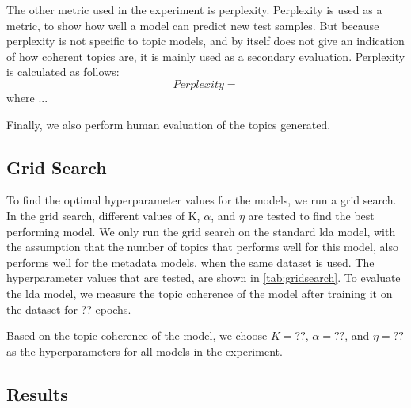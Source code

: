 The other metric used in the experiment is perplexity.
Perplexity is used as a metric, to show how well a model can predict new test samples.
But because perplexity is not specific to topic models, and by itself does not give an indication of how coherent topics are, it is mainly used as a secondary evaluation.
Perplexity is calculated as follows:
\begin{equation}
	Perplexity = 
\end{equation}
\noindent where ...

Finally, we also perform human evaluation of the topics generated.

\subsection{Grid Search}\label{sec:experiment_gridsearch}
To find the optimal hyperparameter values for the models, we run a grid search.
In the grid search, different values of K, $\alpha$, and $\eta$ are tested to find the best performing model.
We only run the grid search on the standard \gls{lda} model, with the assumption that the number of topics that performs well for this model, also performs well for the metadata models, when the same dataset is used.
The hyperparameter values that are tested, are shown in \autoref{tab:gridsearch}.
To evaluate the \gls{lda} model, we measure the topic coherence of the model after training it on the dataset for ?? epochs.

Based on the topic coherence of the model, we choose $K = ??$, $\alpha = ??$, and $\eta = ??$ as the hyperparameters for all models in the experiment.



\subsection{Results}\label{sec:results}



